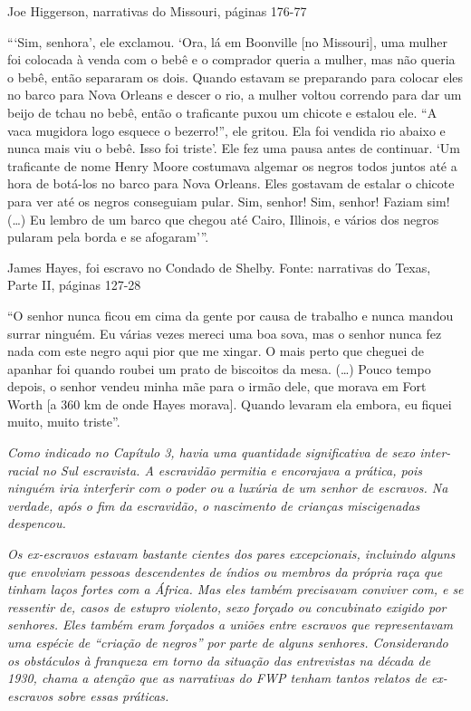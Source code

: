 Joe Higgerson, narrativas do Missouri, páginas 176-77

```Sim, senhora', ele exclamou. `Ora, lá em Boonville {[}no Missouri{]},
uma mulher foi colocada à venda com o bebê e o comprador queria a
mulher, mas não queria o bebê, então separaram os dois. Quando estavam
se preparando para colocar eles no barco para Nova Orleans e descer o
rio, a mulher voltou correndo para dar um beijo de tchau no bebê, então
o traficante puxou um chicote e estalou ele. ``A vaca mugidora logo
esquece o bezerro!'', ele gritou. Ela foi vendida rio abaixo e nunca
mais viu o bebê. Isso foi triste'. Ele fez uma pausa antes de continuar.
`Um traficante de nome Henry Moore costumava algemar os negros todos
juntos até a hora de botá-los no barco para Nova Orleans. Eles gostavam
de estalar o chicote para ver até os negros conseguiam pular. Sim,
senhor! Sim, senhor! Faziam sim! (\ldots{}) Eu lembro de um barco que
chegou até Cairo, Illinois, e vários dos negros pularam pela borda e se
afogaram'''.

James Hayes, foi escravo no Condado de Shelby. Fonte: narrativas do
Texas, Parte II, páginas 127-28

``O senhor nunca ficou em cima da gente por causa de trabalho e nunca
mandou surrar ninguém. Eu várias vezes mereci uma boa sova, mas o senhor
nunca fez nada com este negro aqui pior que me xingar. O mais perto que
cheguei de apanhar foi quando roubei um prato de biscoitos da mesa.
(\ldots{}) Pouco tempo depois, o senhor vendeu minha mãe para o irmão
dele, que morava em Fort Worth {[}a 360 km de onde Hayes morava{]}.
Quando levaram ela embora, eu fiquei muito, muito triste''.

\emph{Como indicado no Capítulo 3, havia uma quantidade significativa de
sexo inter-racial no Sul escravista. A escravidão permitia e encorajava
a prática, pois ninguém iria interferir com o poder ou a luxúria de um
senhor de escravos. Na verdade, após o fim da escravidão, o nascimento
de crianças miscigenadas despencou.}

\emph{Os ex-escravos estavam bastante cientes dos pares excepcionais,
incluindo alguns que envolviam pessoas descendentes de índios ou membros
da própria raça que tinham laços fortes com a África. Mas eles também
precisavam conviver com, e se ressentir de, casos de estupro violento,
sexo forçado ou concubinato exigido por senhores. Eles também eram
forçados a uniões entre escravos que representavam uma espécie de
``criação de negros'' por parte de alguns senhores. Considerando os
obstáculos à franqueza em torno da situação das entrevistas na década de
1930, chama a atenção que as narrativas do FWP tenham tantos relatos de
ex-escravos sobre essas práticas.}

